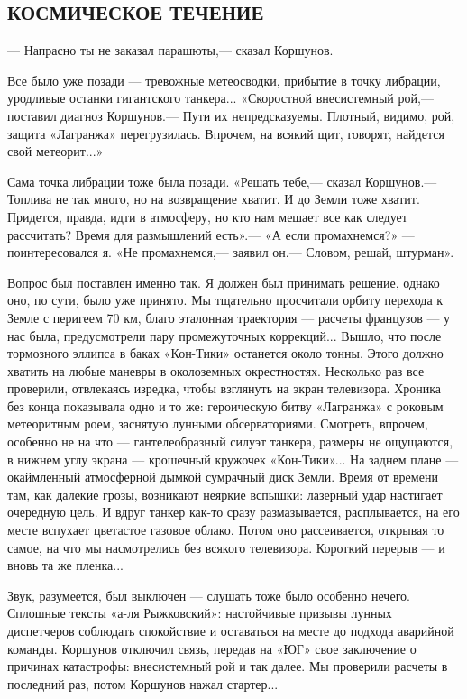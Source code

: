 \documentclass[11pt,a4paper,oneside]{article}
\begin{document}
\subsection{КОСМИЧЕСКОЕ ТЕЧЕНИЕ}
\label{cosmic_flow}

— Напрасно ты не заказал парашюты,— сказал Коршунов.

Все было уже позади — тревожные метеосводки, прибытие в точку либрации, уродливые останки гигантского танкера... «Скоростной внесистемный рой,— поставил диагноз Коршунов.— Пути их непредсказуемы. Плотный, видимо, рой, защита «Лагранжа» перегрузилась. Впрочем, на всякий щит, говорят, найдется свой метеорит...»

Сама точка либрации тоже была позади. «Решать тебе,— сказал Коршунов.— Топлива не так много, но на возвращение хватит. И до Земли тоже хватит. Придется, правда, идти в атмосферу, но кто нам мешает все как следует рассчитать? Время для размышлений есть».— «А если промахнемся?» — поинтересовался я. «Не промахнемся,— заявил он.— Словом, решай, штурман».

Вопрос был поставлен именно так. Я должен был принимать решение, однако оно, по сути, было уже принято. Мы тщательно просчитали орбиту перехода к Земле с перигеем 70 км, благо эталонная траектория — расчеты французов — у нас была, предусмотрели пару промежуточных коррекций... Вышло, что после тормозного эллипса в баках «Кон-Тики» останется около тонны. Этого должно хватить на любые маневры в околоземных окрестностях. Несколько раз все проверили, отвлекаясь изредка, чтобы взглянуть на экран телевизора. Хроника без конца показывала одно и то же: героическую битву «Лагранжа» с роковым метеоритным роем, заснятую лунными обсерваториями. Смотреть, впрочем, особенно не на что — гантелеобразный силуэт танкера, размеры не ощущаются, в нижнем углу экрана — крошечный кружочек «Кон-Тики»... На заднем плане — окаймленный атмосферной дымкой сумрачный диск Земли. Время от времени там, как далекие грозы, возникают неяркие вспышки: лазерный удар настигает очередную цель. И вдруг танкер как-то сразу размазывается, расплывается, на его месте вспухает цветастое газовое облако. Потом оно рассеивается, открывая то самое, на что мы насмотрелись без всякого телевизора. Короткий перерыв — и вновь та же пленка...

Звук, разумеется, был выключен — слушать тоже было особенно нечего. Сплошные тексты «а-ля Рыжковский»: настойчивые призывы лунных диспетчеров соблюдать спокойствие и оставаться на месте до подхода аварийной команды. Коршунов отключил связь, передав на «ЮГ» свое заключение о причинах катастрофы: внесистемный рой и так далее. Мы проверили расчеты в последний раз, потом Коршунов нажал стартер...
\end{document}
